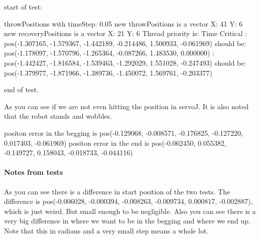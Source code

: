 start of test:\newline

throwPositions with timeStep:  0.05
\newline new throwPositions is a vector X: 41 Y:  6
\newline new recoveryPositions is a vector X: 21 Y:  6
\newline Thread priority is: Time Critical
\newline [0.000000s - Step 0/41]:
\newline \hspace{1cm}        pos(-1.307165, -1.579367, -1.442189, -0.214486, 1.500933, -0.061969) should be:
\newline \hspace{1cm}        pos(-1.178097, -1.570796, -1.265364, -0.087266, 1.483530, 0.000000)
\newline [2.000000s - Step 40/41]:
\newline \hspace{1cm}        pos(-1.442427, -1.816584, -1.539463, -1.292029, 1.551028, -0.247493) should be:
\newline \hspace{1cm}       pos(-1.379977, -1.871966, -1.389736, -1.450072, 1.569761, -0.203377)\newline

end of test.\newline 

As you can see if we are not even hitting the position in servoJ. It is also noted that the robot stands and wobbles.\newline

positon error in the begging is pos(-0.129068, -0.008571, -0.176825, -0.127220, 0.017403, -0.061969)
\newline positon error in the end is pos(-0.062450, 0.055382, -0.149727, 0.158043, -0.018733, -0.044116)

\paragraph{Notes from tests}
As you can see there is a difference in start position of the two tests. The difference is pos(-0.006028, -0.000394, -0.008263, -0.009734, 0.000817, -0.002887), which is just weird. But small enough to be negligible.
\newline Also you can see there is a very big difference in where we want to be in the begging and where we end up. Note that this in radians and a very small step means a whole lot.\newline

